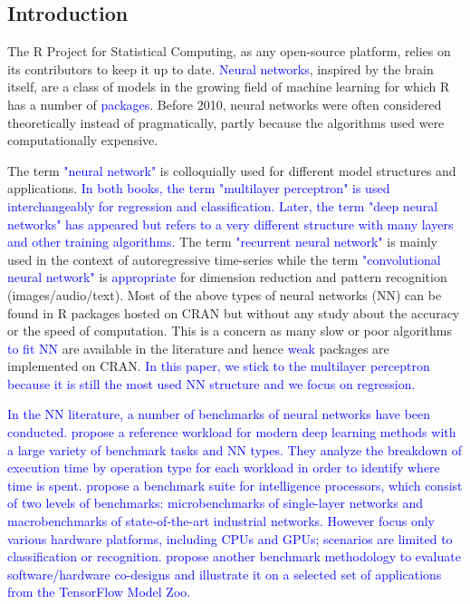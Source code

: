 \hypertarget{introduction}{%
\subsection{Introduction}\label{introduction}}

The \textsf{R} Project for Statistical Computing, as any open-source
platform, relies on its contributors to keep it up to date.
\textcolor{blue}{Neural networks}, inspired by the brain itself, are a
class of models in the growing field of machine learning for which
\textsf{R} has a number of \textcolor{blue}{packages}. Before 2010,
neural networks were often considered theoretically instead of
pragmatically, partly because the algorithms used were computationally
expensive.

The term \textcolor{blue}{"neural network"} is colloquially used for
different model structures and applications.
\textcolor{blue}{In both \cite{Bishop-NNPR95,ripley2007pattern} books,
the term "multilayer perceptron" is used interchangeably for regression and classification.
Later, the term "deep neural networks" has appeared but refers to a very different
structure with many layers and other training algorithms.} The term
\textcolor{blue}{"recurrent neural network"} is mainly used in the
context of autoregressive time-series while the term
\textcolor{blue}{"convolutional neural network"} is
\textcolor{blue}{appropriate} for dimension reduction and pattern
recognition (images/audio/text). Most of the above types of neural
networks (NN) can be found in \textsf{R} packages hosted on CRAN but
without any study about the accuracy or the speed of computation. This
is a concern as many slow or poor algorithms \textcolor{blue}{to fit NN}
are available in the literature and hence \textcolor{blue}{weak}
packages are implemented on CRAN. \textcolor{blue}{
In this paper, we stick to the multilayer perceptron because it is still the most used
NN structure and we focus on regression.}

\textcolor{blue}{In the NN literature, a number
of benchmarks of neural networks have been conducted.
\citep{adolf2016fathom} propose a reference workload
for modern deep learning methods with a large variety
of benchmark tasks and NN types. 
They analyze the breakdown of execution time by operation 
type for each workload in order to identify where time
is spent.
\citep{tao2018benchip} propose a benchmark suite for 
intelligence processors, which consist of two levels 
of benchmarks: microbenchmarks of single-layer networks 
and macrobenchmarks of state-of-the-art industrial networks.
However \citep{tao2018benchip} focus only various hardware
platforms, including CPUs and GPUs; scenarios are limited
to classification or recognition.
\citep{xie2020nnbench} propose another benchmark methodology
to evaluate software/hardware co-designs and illustrate
it on a selected set of applications from the TensorFlow Model Zoo. 
}

